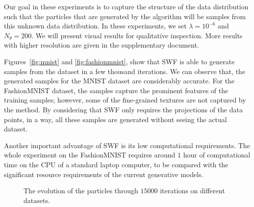 Our goal in these experiments is to capture the structure of the data distribution such that the particles that are generated by the algorithm will be samples from this unknown data distribution. In these experiments, we set $\lambda=10^{-6}$ and $N_\theta=200$. We will present visual results for qualitative inspection. More results with higher resolution are given in the supplementary document. 

Figures~\ref{fig:mnist} and \ref{fig:fashionmnist}, show that SWF is able to generate samples from the dataset in a few thousand iterations. We can observe that, the generated samples for the MNIST dataset are considerably accurate. For the FashionMNIST dataset, the samples capture the prominent features of the training samples; however, some of the fine-grained textures are not captured by the method. By considering that SWF only requires the projections of the data points, in a way, all these samples are generated without seeing the actual dataset.


Another important advantage of SWF is its low computational requirements. The whole experiment on the FashionMNIST requires around $1$ hour of computational time on the CPU of a standard laptop computer, to be compared with the significant resource requirements of the current generative models.








\begin{figure}[t]
\centering
{}\hfill
{}
\vspace{-10pt}
\caption{The evolution of the particles through $15000$ iterations on different datasets.}
\end{figure}





